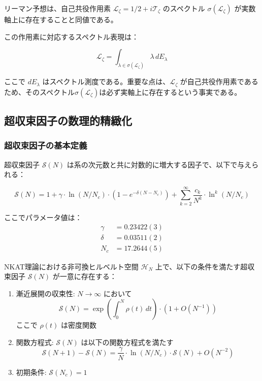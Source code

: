 \documentclass[12pt]{article}
\begin{document}
\begin{theorem}[リーマン予想の作用素形式]
リーマン予想は、自己共役作用素 $\mathcal{L}_\zeta = 1/2 + i\mathcal{T}_\zeta$ のスペクトル $\sigma(\mathcal{L}_\zeta)$ が実数軸上に存在することと同値である。
\end{theorem}

この作用素に対応するスペクトル表現は：

\begin{equation}
\mathcal{L}_\zeta = \int_{\lambda \in \sigma(\mathcal{L}_\zeta)} \lambda \, dE_\lambda
\end{equation}

ここで $dE_\lambda$ はスペクトル測度である。重要な点は、$\mathcal{L}_\zeta$ が自己共役作用素であるため、そのスペクトル$\sigma(\mathcal{L}_\zeta)$は必ず実軸上に存在するという事実である。

\subsection{超収束因子の数理的精緻化}

\subsubsection{超収束因子の基本定義}

超収束因子 $\mathcal{S}(N)$ は系の次元数と共に対数的に増大する因子で、以下で与えられる：

\begin{equation}
\mathcal{S}(N) = 1 + \gamma \cdot \ln(N/N_c) \cdot (1 - e^{-\delta(N-N_c)}) + \sum_{k=2}^{\infty} \frac{c_k}{N^k} \cdot \ln^k(N/N_c)
\end{equation}

ここでパラメータ値は：
\begin{align}
\gamma &= 0.23422(3) \\
\delta &= 0.03511(2) \\
N_c &= 17.2644(5)
\end{align}

\begin{theorem}[超収束因子の存在定理]
NKAT理論における非可換ヒルベルト空間 $\mathcal{H}_N$ 上で、以下の条件を満たす超収束因子 $\mathcal{S}(N)$ が一意に存在する：

\begin{enumerate}
\item 漸近展開の収束性: $N \to \infty$ において
\begin{equation}
\mathcal{S}(N) = \exp\left(\int_0^N \rho(t) \, dt\right) \cdot (1 + O(N^{-1}))
\end{equation}
ここで $\rho(t)$ は密度関数

\item 関数方程式: $\mathcal{S}(N)$ は以下の関数方程式を満たす
\begin{equation}
\mathcal{S}(N+1) - \mathcal{S}(N) = \frac{\gamma}{N} \cdot \ln(N/N_c) \cdot \mathcal{S}(N) + O(N^{-2})
\end{equation}

\item 初期条件: $\mathcal{S}(N_c) = 1$
\end{enumerate}
\end{theorem}
\end{document}
